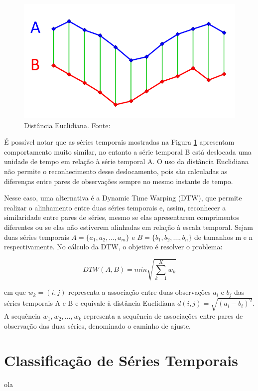 \begin{figure}[H]
	\centering
	\includegraphics[scale=0.3]{pasta1_figuras/ED.png}
	\caption {Distância Euclidiana. Fonte: \cite{ferraz2016}}
	\label{fig-distED}
\end{figure}

É possível notar que as séries temporais mostradas na Figura \ref{fig-distED} apresentam comportamento muito similar, no entanto a série temporal B está deslocada uma unidade de tempo em relação à série temporal A. O uso da distância Euclidiana não permite o reconhecimento desse deslocamento, pois são calculadas as diferenças entre pares de observações sempre no mesmo instante de tempo.

Nesse caso, uma alternativa é a Dynamic Time Warping (DTW)\cite{Berndt:1994:UDT:3000850.3000887}, que permite realizar o alinhamento entre duas séries temporais e, assim, reconhecer a similaridade entre pares de séries, mesmo se elas apresentarem comprimentos diferentes ou se elas não estiverem alinhadas em relação à escala temporal. Sejam duas séries temporais $A = \{a_1,a_2,...,a_m \}$ e $B = \{b_1,b_2,...,b_n \}$  de tamanhos m e n respectivamente. No cálculo da DTW, o objetivo é resolver o problema:

\begin{equation}
DTW(A,B) = min\sqrt{\sum_{k=1}^{K}w_k}
\end{equation}

em que $w_k = (i,j)$ representa a associação entre duas observações $a_i$ e $b_j$ das séries temporais A e B e equivale à distância Euclidiana $d(i,j) = \sqrt{(a_i - b_i)^2}$. A sequência $w_1,w_2,...,w_k$ representa a sequência de associações entre pares de observação das duas séries, denominado o caminho de ajuste. 

 
\section{Classificação de Séries Temporais}
ola



